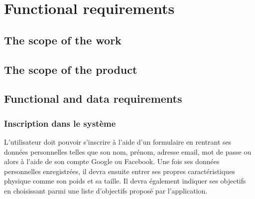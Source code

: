 \chapter{Functional requirements}

\section{The scope of the work}

\section{The scope of the product}

\section{Functional and data requirements}

\subsection{Inscription dans le système}

L'utilisateur doit pouvoir s'inscrire à l'aide d'un formulaire en rentrant ses données personnelles telles que son nom, prénom, adresse email, mot de passe ou alors à l'aide de son compte Google ou Facebook. Une fois ses données personnelles enregistrées, il devra ensuite entrer ses propres caractéristiques physique comme son poids et sa taille. Il devra également indiquer ses objectifs en choisissant parmi une liste d'objectifs proposé par l'application.

